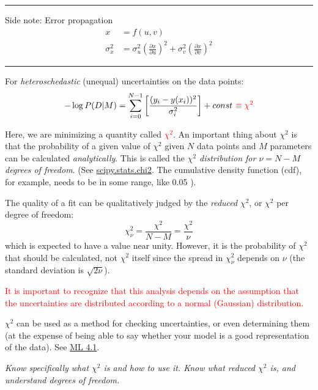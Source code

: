 \documentclass{article}
\newcommand{\test}[1]{%
    \begin{center}
        \colorbox{hl}{\parbox{0.9\textwidth}{\emph{#1}}}
    \end{center}}
\begin{document}
\hrule
Side note: Error propagation
\begin{align*}
    x &= f(u,v)\\
    \sigma_{x}^{2} &=
    \sigma_{u}^{2}\left(\frac{\partial{x}}{\partial{u}}\right)^{2} +
    \sigma_{v}^{2}\left(\frac{\partial{x}}{\partial{v}}\right)^{2}
\end{align*}
\hrule

For \emph{heteroschedastic} (unequal) uncertainties on the data points:
$$ -\log P(D|M) = \sum_{i=0}^{N-1}\left[
\frac{(y_i-y(x_i))^{2}}{\sigma_{i}^{2}}\right] + const\
\textcolor{red}{\equiv \chi^2} $$

Here, we are minimizing a quantity called \textcolor{red}
{$\chi^{2}$}. An important thing about $\chi^{2}$ is that the probability
of a given value of $\chi^{2}$ given $N$ data points and $M$ parameters
can be calculated \emph{analytically}. This is called the
{\it $\chi^2$ distribution for $\nu = N-M$ degrees of freedom}.
(See
\href{http://docs.scipy.org/doc/scipy-0.15.1/reference/generated/scipy.stats.chi2.html}
{scipy.stats.chi2}. The cumulative density function (cdf), for example,
needs to be in some range, like 0.05 \- 0.95).

The quality of a fit can be qualitatively judged by the
\emph{reduced} $\chi^2$, or $\chi^2$ per degree of freedom:
$$  \chi_{\nu}^{2} = \frac{\chi^{2}}{N-M} = \frac{\chi^{2}}{\nu}
$$
which is expected to have a value near unity.
However, it is the probability of $\chi^2$ that should be calculated, not
$\chi^{2}$ itself since
the spread in $\chi_{\nu}^2$ depends on $\nu$ (the standard deviation
is $\sqrt{2\nu}$).

\textcolor{red}{It is important to recognize that this analysis depends
on the assumption that the uncertainties are distributed according to
a normal (Gaussian) distribution.}

$\chi^{2}$ can be used as a method for checking uncertainties, or even
determining them (at the expense of being able to say whether your
model is a good representation of the data).
See \href{http://astronomy.nmsu.edu/holtz/a575/images/ML4.1.png}
{ML 4.1}.

\test{Know specifically what $\chi^{2}$ is and how to use it.  Know what reduced
$\chi^{2}$ is, and understand degrees of freedom.}
\end{document}
